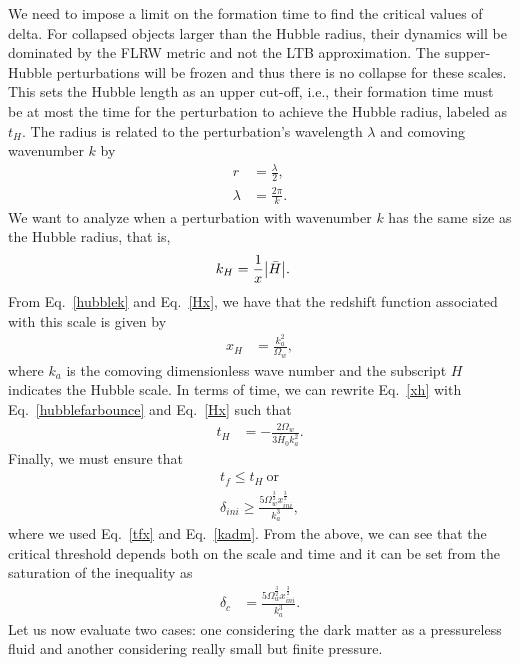 \documentclass[a4paper,11pt]{article}
\begin{document}
We need to impose a limit on the formation time to find the critical values of delta.
For collapsed objects larger than the Hubble radius, their dynamics will be dominated by
the FLRW metric and not the LTB approximation. The supper-Hubble perturbations will be
frozen and thus there is no collapse for these scales. This sets the Hubble length as an
upper cut-off, i.e., their formation time must be at most the time for the perturbation
to achieve the Hubble radius, labeled as $t_H$.  The radius is related to the
perturbation's wavelength $\lambda$ and comoving wavenumber $k$ by~\cite{Quintin2016}
\begin{align}
	\label{radius}
	r       & =\frac{\lambda}{2}, \\
	\label{wavelength}
	\lambda & = \frac{2 \pi}{k}.
\end{align}
We want to analyze when a perturbation with wavenumber $k$ has the same size as the
Hubble radius, that is,
\begin{align}
	\label{hubblek}
	k_H & = \frac{1}{x}\abs{\Bar{H}}
	.\end{align}
From Eq.~\eqref{hubblek} and Eq.~\eqref{Hx}, we have that the redshift function
associated with this scale is given by
\begin{align}
	\label{xh}
	x_H & = \frac{k_a^2 }{\Omega_w}
	,\end{align}
where $k_a$ is the comoving dimensionless wave number and the subscript $H$ indicates
the Hubble scale. In terms of time, we can rewrite Eq.~\eqref{xh} with
Eq.~\eqref{hubblefarbounce} and Eq.~\eqref{Hx} such that
\begin{align}
	t_H & = -\frac{2\Omega_w}{3 \bar{H}_0 k_a^2}
	.\end{align}
Finally, we must ensure that
\begin{align}
	\label{deltacf}
	t_f \leq t_H ~\text{or}\nonumber \\
	\delta_{ini} \geq \frac{5\Omega_w^{\frac{3}{2}} x_{ini}^{\frac{3}{2}}}{k_a^3}
	,\end{align}
where we used Eq.~\eqref{tfx} and Eq.~\eqref{kadm}. From the above, we can see that the
critical threshold depends both on the scale and time and it can be set from the
saturation of the inequality as
\begin{align}
	\label{deltacfinal}
	\delta_c & =
	\frac{5 \Omega_w^{\frac{3}{2}} x_{ini}^{\frac{3}{2}}}{k_a^3}
	.\end{align}
Let us now evaluate two cases: one considering the dark matter as a pressureless fluid
and another considering really small but finite pressure.
\end{document}
